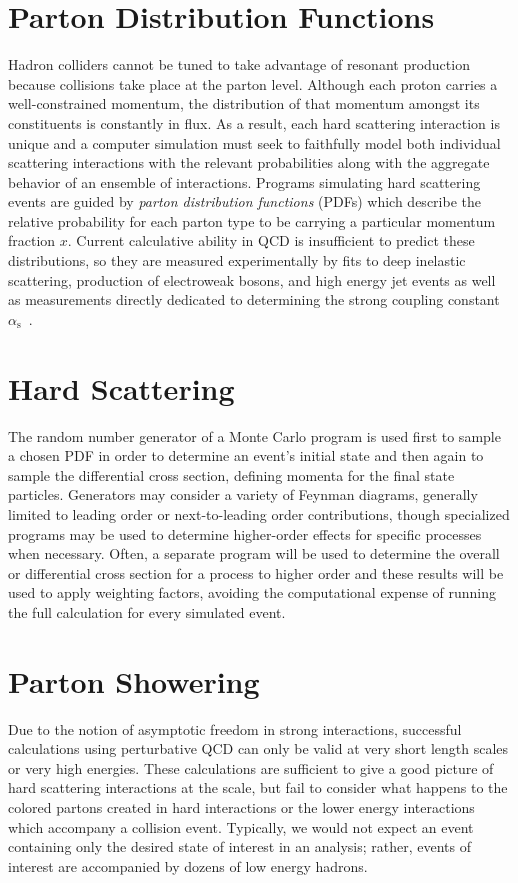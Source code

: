 \section{Parton Distribution Functions}
Hadron colliders cannot be tuned to take advantage of resonant production because collisions take place at the parton level.  Although each proton carries a well-constrained momentum, the distribution of that momentum amongst its constituents is constantly in flux.  As a result, each hard scattering interaction is unique and a computer simulation must seek to faithfully model both individual scattering interactions with the relevant probabilities along with the aggregate behavior of an ensemble of interactions.  Programs simulating hard scattering events are guided by \emph{parton distribution functions} (PDFs) which describe the relative probability for each parton type to be carrying a particular momentum fraction $x$.  Current calculative ability in QCD is insufficient to predict these distributions, so they are measured experimentally by fits to deep inelastic scattering, production of electroweak bosons, and high energy jet events as well as measurements directly dedicated to determining the strong coupling constant $\alpha_\text{s}$~\cite{CTEQ,MRST}.

\section{Hard Scattering}
The random number generator of a Monte Carlo program is used first to sample a chosen PDF in order to determine an event's initial state and then again to sample the differential cross section, defining momenta for the final state particles. Generators may consider a variety of Feynman diagrams, generally limited to leading order or next-to-leading order contributions, though specialized programs may be used to determine higher-order effects for specific processes when necessary.  Often, a separate program will be used to determine the overall or differential cross section for a process to higher order and these results will be used to apply weighting factors, avoiding the computational expense of running the full calculation for every simulated event.

\section{Parton Showering}

Due to the notion of asymptotic freedom in strong interactions, successful calculations using perturbative QCD can only be valid at very short length scales or very high energies.  These calculations are sufficient to give a good picture of hard scattering interactions at the \TeV scale, but fail to 
consider what happens to the colored partons created in hard interactions or the lower energy interactions which accompany a collision event.  Typically, we would not expect an event containing only the desired state of interest in an analysis; rather, events of interest are accompanied by dozens of low energy hadrons.

